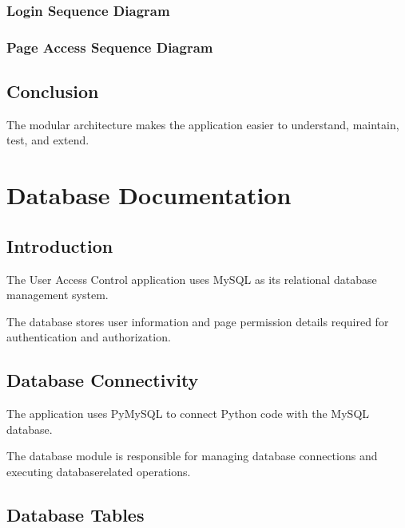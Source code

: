 \documentclass[letterpaper,10pt,english]{sphinxmanual}
\begin{document}
\subsubsection{Login Sequence Diagram}
\label{\detokenize{architecture:login-sequence-diagram}}

\subsubsection{Page Access Sequence Diagram}
\label{\detokenize{architecture:page-access-sequence-diagram}}

\subsection{Conclusion}
\label{\detokenize{architecture:conclusion}}
\sphinxAtStartPar
The modular architecture makes the application easier to understand,
maintain, test, and extend.

\sphinxstepscope


\section{Database Documentation}
\label{\detokenize{database:database-documentation}}\label{\detokenize{database::doc}}

\subsection{Introduction}
\label{\detokenize{database:introduction}}
\sphinxAtStartPar
The User Access Control application uses MySQL as its relational database
management system.

\sphinxAtStartPar
The database stores user information and page permission details required
for authentication and authorization.


\subsection{Database Connectivity}
\label{\detokenize{database:database-connectivity}}
\sphinxAtStartPar
The application uses PyMySQL to connect Python code with the MySQL database.

\sphinxAtStartPar
The database module is responsible for managing database connections and
executing database\sphinxhyphen{}related operations.


\subsection{Database Tables}
\label{\detokenize{database:database-tables}}
\end{document}
